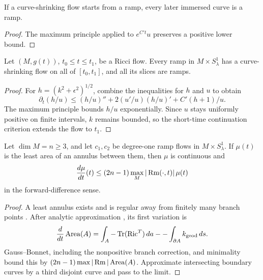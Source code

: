 \begin{corollary}
\label{cor:ramp-preserved-under-flow}
\label{ubd}
If a curve-shrinking flow starts from a ramp, every later immersed curve is a
ramp.
\end{corollary}
\begin{proof}
\sketch The maximum principle applied to $e^{C't}u$ preserves a positive lower bound.
\end{proof}

\begin{lemma}
\label{lem:curve-shrinking-exists-for-ramps}
\label{csforramps}
Let $(M,g(t))$, $t_0\le t\le t_1$, be a Ricci flow. Every ramp in
$M\times S^1_\lambda$ has a curve-shrinking flow on all of $[t_0,t_1]$, and
all its slices are ramps.
\end{lemma}
\begin{proof}
\sketch {}
For $h=(k^2+\epsilon^2)^{1/2}$, combine the inequalities for $h$ and $u$ to
obtain
\[
\partial_t(h/u)\le(h/u)''+2(u'/u)(h/u)'+C'(h+1)/u.
\]
The maximum principle bounds $h/u$ exponentially. Since $u$ stays uniformly
positive on finite intervals, $k$ remains bounded, so the short-time
continuation criterion extends the flow to $t_1$.
\end{proof}

\begin{lemma}
\label{lem:minimal-annulus-area-growth}
\label{mugrowth}
Let $\dim M=n\ge3$, and let $c_1,c_2$ be degree-one ramp flows in
$M\times S^1_\lambda$. If $\mu(t)$ is the least area of an annulus between
them, then $\mu$ is continuous and
\[
\frac{d\mu}{dt}(t)\le(2n-1)\max_M|\operatorname{Rm}(\cdot,t)|\,\mu(t)
\]
in the forward-difference sense.
\end{lemma}
\begin{proof}
\sketch A least annulus exists and is regular away from finitely many branch
points \cite{Hildebrandt,Morrey}. After analytic approximation
\cite{Bando,GageHamilton}, its first variation is
\[
\frac d{dt}\operatorname{Area}(A)=\int_A-\operatorname{Tr}(\operatorname{Ric}^T)\,da
--\int_{\partial A}k_{\mathrm{geod}}\,ds.
\]
Gauss--Bonnet, including the nonpositive branch correction, and minimality
bound this by $(2n-1)\max|\operatorname{Rm}|\operatorname{Area}(A)$. Approximate intersecting boundary
curves by a third disjoint curve and pass to the limit.
\end{proof}

